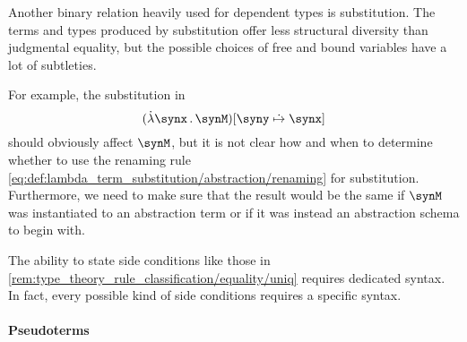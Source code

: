 \begin{remark}
\begin{thmenum}
     Another binary relation heavily used for dependent types is substitution. The terms and types produced by substitution offer less structural diversity than judgmental equality, but the possible choices of free and bound variables have a lot of subtleties.

    For example, the substitution in
    \begin{equation*}
      (\qabs \synx \synM)[\syny \mathrel{\syn\mapsto} \synx]
    \end{equation*}
    should obviously affect \( \synM \), but it is not clear how and when to determine whether to use the renaming rule \eqref{eq:def:lambda_term_substitution/abstraction/renaming} for substitution. Furthermore, we need to make sure that the result would be the same if \( \synM \) was instantiated to an abstraction term or if it was instead an abstraction schema to begin with.

     The ability to state side conditions like those in \cref{rem:type_theory_rule_classification/equality/uniq} requires dedicated syntax. In fact, every possible kind of side conditions requires a specific syntax.
  \end{thmenum}
\end{remark}

\paragraph{Pseudoterms}

